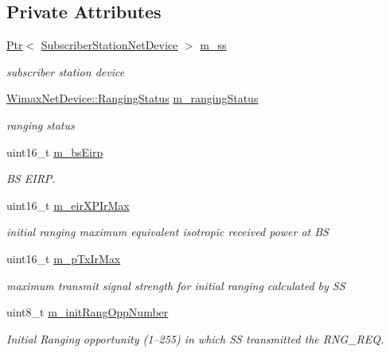 \subsection*{Private Attributes}
\begin{DoxyCompactItemize}
\item 
\hyperlink{classns3_1_1Ptr}{Ptr}$<$ \hyperlink{classns3_1_1SubscriberStationNetDevice}{Subscriber\+Station\+Net\+Device} $>$ \hyperlink{classns3_1_1SSLinkManager_a44506c63befdc33eb0e0b4ba7f93d498}{m\+\_\+ss}
\begin{DoxyCompactList}\small\item\em subscriber station device \end{DoxyCompactList}\item 
\hyperlink{classns3_1_1WimaxNetDevice_a2a74c0f01e51abc1851a630242e7b591}{Wimax\+Net\+Device\+::\+Ranging\+Status} \hyperlink{classns3_1_1SSLinkManager_ae21f07956edc47367365d56c7913eee7}{m\+\_\+ranging\+Status}
\begin{DoxyCompactList}\small\item\em ranging status \end{DoxyCompactList}\item 
uint16\+\_\+t \hyperlink{classns3_1_1SSLinkManager_aab4c93b31d31b49faafdf0934e384106}{m\+\_\+bs\+Eirp}
\begin{DoxyCompactList}\small\item\em BS E\+I\+RP. \end{DoxyCompactList}\item 
uint16\+\_\+t \hyperlink{classns3_1_1SSLinkManager_a6f1082234c10d469aaf83975e851f5a3}{m\+\_\+eir\+X\+P\+Ir\+Max}
\begin{DoxyCompactList}\small\item\em initial ranging maximum equivalent isotropic received power at BS \end{DoxyCompactList}\item 
uint16\+\_\+t \hyperlink{classns3_1_1SSLinkManager_a2ab2dc4d93d45e1d43163c02c5d38869}{m\+\_\+p\+Tx\+Ir\+Max}
\begin{DoxyCompactList}\small\item\em maximum transmit signal strength for initial ranging calculated by SS \end{DoxyCompactList}\item 
uint8\+\_\+t \hyperlink{classns3_1_1SSLinkManager_a268da8bf334b79ef5d61926c7735cc3e}{m\+\_\+init\+Rang\+Opp\+Number}
\begin{DoxyCompactList}\small\item\em Initial Ranging opportunity (1–255) in which SS transmitted the R\+N\+G\+\_\+\+R\+EQ. \end{DoxyCompactList}\item 

\end{DoxyCompactItemize}
